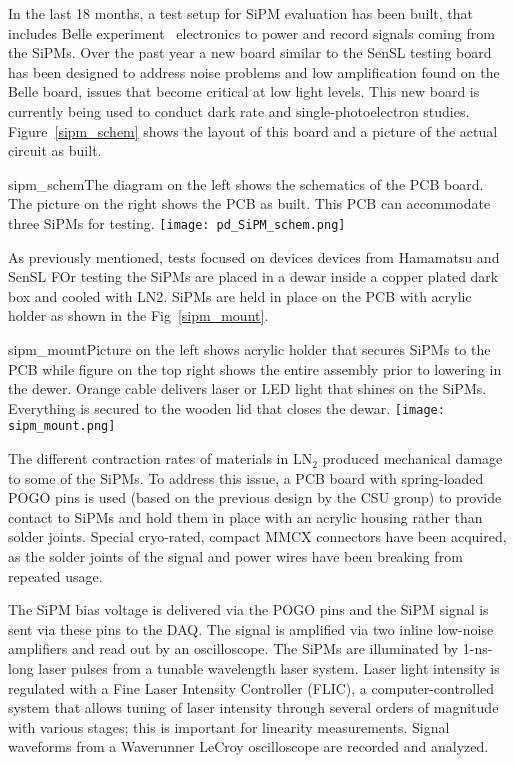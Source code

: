 In the last 18 months, a test setup for SiPM evaluation has been
built, that includes Belle experiment~\cite{BELLE_READOUT} electronics
to power and record signals coming from the SiPMs.  Over the past year
a new board similar to the SenSL testing board has been designed to
address noise problems and low amplification found on the Belle board,
issues that become critical at low light levels. This new board is
currently being used to conduct dark rate and single-photoelectron
studies.  Figure~\ref{sipm_schem} shows the layout of this board and a
picture of the actual circuit as built.

\begin{cdrfigure}{sipm_schem}{The diagram on the left shows the schematics
    of the PCB board. The picture  on the right shows the PCB as
    built. This PCB can accommodate three SiPMs for testing.}  
  \texttt{[image: pd\_SiPM\_schem.png]}
\end{cdrfigure}

As previously mentioned, tests focused on devices devices from
Hamamatsu and SenSL FOr testing the SiPMs are placed in a dewar inside
a copper plated dark box and cooled with LN2. SiPMs are held in place
on the PCB with acrylic holder as shown in the
Fig~\ref{sipm_mount}. 

\begin{cdrfigure}{sipm_mount}{Picture on the left shows acrylic holder that
    secures SiPMs to the PCB while figure on the top right shows the
    entire assembly prior to lowering in the dewer. Orange cable
    delivers laser or LED light that shines on the SiPMs. Everything
    is secured to the wooden lid that closes the dewar.}   
  \texttt{[image: sipm\_mount.png]}
\end{cdrfigure}

The different contraction rates of materials in LN$_2$ produced mechanical
damage to some of the SiPMs. To address this issue, a PCB board with
spring-loaded POGO pins is used (based on the previous design by the
CSU group) to provide contact to SiPMs and hold them in place with
an acrylic housing rather than solder joints. Special cryo-rated, compact
MMCX connectors have been acquired, as the solder joints of the signal
and power wires have been breaking from repeated usage.

The SiPM bias voltage is delivered via the POGO pins and the SiPM
signal is sent via these pins to the DAQ. The signal is amplified via
two inline low-noise amplifiers and read out by an oscilloscope. The
SiPMs are illuminated by 1-ns-long laser pulses from a tunable
wavelength laser system. Laser light intensity is regulated with a
Fine Laser Intensity Controller (FLIC), a computer-controlled system
that allows tuning of laser intensity through several orders of
magnitude with various stages; this is important for linearity
measurements. Signal waveforms from a Waverunner LeCroy oscilloscope
are recorded and analyzed.

